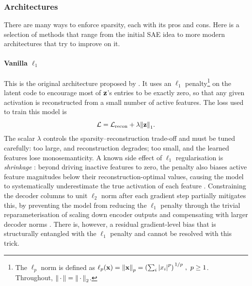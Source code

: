 \subsubsection{Architectures} \label{sec:background:ae:sae:arch}
There are many ways to enforce sparsity, each with its pros and cons. Here is a
selection of methods that range from the initial \ac{SAE} idea to more modern
architectures that try to improve on it.

    \paragraph{Vanilla $\ell_{1}$} This is the original architecture proposed by
    \citet{hubenSparseAutoencodersFind2023}. It uses an $\ell_{1}$
    penalty\footnote{The $\ell_{p}$ norm is defined as $\ell_{p}(\vb{x}) =
    \norm{\vb{x}}_{p} = \left(\sum_{i}
    \abs{x_{i}}^{p}\right)^{\flatfrac{1}{p}},\ p \ge 1$. Throughout,
    $\norm{\,\cdot\,} = \norm{\,\cdot\,}_{2}$.} on the latent
    code to encourage most of $\vb{z}$'s entries to be exactly zero, so that any
    given activation is reconstructed from a small number of active features.
    The loss used to train this model is
    \begin{equation} \label{eq:background:ae:sae:l1-loss}
        \mathcal{L} = \mathcal{L}_{\mathrm{recon}} + \lambda \norm{\vb{z}}_{1}.
    \end{equation}
    The scalar $\lambda$ controls the sparsity--reconstruction trade-off and
    must be tuned carefully: too large, and reconstruction degrades; too small,
    and the learned features lose monosemanticity. A known side effect of
    $\ell_{1}$ regularisation is \textit{shrinkage}
    \cite{wrightAddressingFeatureSuppression2024,
    tibshiraniRegressionShrinkageSelection1996}: beyond driving inactive
    features to zero, the penalty also biases active feature magnitudes below
    their reconstruction-optimal values, causing the model to systematically
    underestimate the true activation of each feature
    \cite{rajamanoharanImprovingSparseDecomposition2024,
    wrightAddressingFeatureSuppression2024}. Constraining the decoder columns to
    unit $\ell_{2}$ norm after each gradient step partially mitigates this, by
    preventing the model from reducing the $\ell_{1}$ penalty through the
    trivial reparameterisation of scaling down encoder outputs and compensating
    with larger decoder norms
    \cite{rajamanoharanImprovingSparseDecomposition2024}. There is, however, a
    residual gradient-level bias that is structurally entangled with the
    $\ell_{1}$ penalty and cannot be resolved with this trick.

